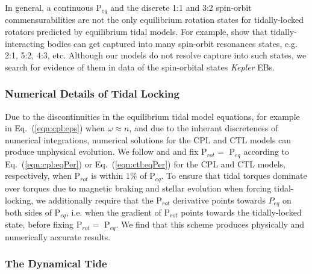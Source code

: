 \documentclass[twocolumn]{aastex61}
\newcommand{\xxx}[1]{{\textbf{#1}}}
\newcommand{\kepler}[0]{\textit{Kepler}\xspace}
\begin{document}
In general, a continuous P$_{eq}$ and the discrete 1:1 and 3:2 spin-orbit commensurabilities are not the only equilibrium rotation states for tidally-locked rotators predicted by equilibrium tidal models. For example, \citet{Rodriguez2012} show that tidally-interacting bodies can get captured into many spin-orbit resonances states, e.g. 2:1, 5:2, 4:3, etc. Although our models do not resolve capture into such states, we search for evidence of them in data of the spin-orbital states \kepler EBs.

\subsubsection{Numerical Details of Tidal Locking}

Due to the discontinuities in the equilibrium tidal model equations, for example in Eq.~(\ref{eqn:cpl:eps}) when $\omega \approx n$, and due to the inherant discreteness of numerical integrations, numerical solutions for the CPL and CTL models can produce unphysical evolution. We follow \citet{Barnes2013} and \citet{Fleming2018} and fix P$_{rot} = $ P$_{eq}$ according to Eq.~(\ref{eqn:cpl:eqPer}) or Eq.~(\ref{eqn:ctl:eqPer}) for the CPL and CTL models, respectively, when P$_{rot}$ is within $1\%$ of P$_{eq}$.  To ensure that tidal torques dominate over torques due to magnetic braking and stellar evolution when forcing tidal-locking, we additionally require that the P$_{rot}$ derivative points towards $P_{eq}$ on both sides of P$_{eq}$, i.e. when the gradient of P$_{rot}$ points towards the tidally-locked state, before fixing P$_{rot} = $ P$_{eq}$. We find that this scheme produces physically and numerically accurate results. 

\subsubsection{\xxx{The Dynamical Tide}} \label{sec:methods:dynamicalTide}
\end{document}
